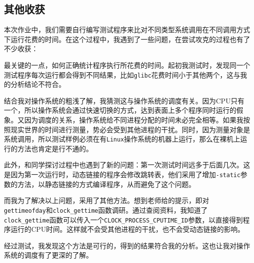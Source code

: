 \subsection{其他收获}

本次作业中，我们需要自行编写测试程序来比对不同类型系统调用在不同调用方式下运行花费的时间。在这个过程中，我遇到了一些问题，在尝试攻克的过程也有了不少收获：

最关键的一点，如何正确统计程序执行所花费的时间。起初我测试时，发现同一个测试程序每次运行都会得到不同结果，比如{\tt glibc}花费时间小于其他两个，这与我的分析结论不符合。

结合我对操作系统的粗浅了解，我猜测这与操作系统的调度有关。因为CPU只有一个，所以操作系统会通过快速切换的方式，达到表面上多个程序同时运行的假象。又因为调度的关系，操作系统给不同进程分配的时间未必完全相等。如果我按照现实世界的时间进行测量，势必会受到其他进程的干扰。同时，因为测量对象是系统调用，所以测试样例必须在有{\tt Linux}操作系统的机器上运行，那么在裸机上运行的方法也肯定是行不通的。

此外，和同学探讨过程中也遇到了新的问题：第一次测试时间远多于后面几次。这是因为第一次运行时，动态链接的程序会修改跳转表，他们采用了增加{\tt -static}参数的方法，以静态链接的方式编译程序，从而避免了这个问题。

而我为了解决以上问题，采用了其他方法。想到老师给的提示，即对{\tt gettimeofday}和{\tt clock\_gettime}函数调研。通过查阅资料，我知道了{\tt clock\_gettime}函数可以传入一个{\tt CLOCK\_PROCESS\_CPUTIME\_ID}参数，以直接得到程序运行的CPU时间。这样就不会受其他进程的干扰，也不会受动态链接的影响。

经过测试，我发现这个方法是可行的，得到的结果符合我的分析。这也让我对操作系统的调度有了更深的了解。
